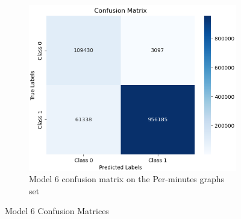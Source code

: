 \begin{figure}[H]
\begin{subfigure}{0.49\textwidth}
    \label{fig:do_2_cm2}
    \end{subfigure}
    \begin{subfigure}{0.49\textwidth}
        \centering
        \includegraphics[width=\linewidth]{figures/ev/do_2_cm3.png}
        \caption{Model 6 confusion matrix on the Per-minutes graphs set}
    \label{fig:do_2_cm3}
    \end{subfigure}
    \captionsetup{font=large}
    \caption{Model 6 Confusion Matrices}
    \label{fig:6_cm}
\end{figure}

